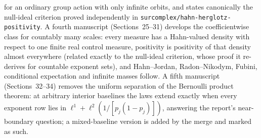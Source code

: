 \documentclass[11pt]{article}
\begin{document}
{for an ordinary group action with only infinite orbits,
and states canonically the null-ideal criterion proved independently in
\nolinkurl{surcomplex/hahn-herglotz-positivity}.  A fourth manuscript (Sections~25--31) develops the coefficientwise
class for countably many scales: every measure has a Hahn-valued density with
respect to one finite real control measure, positivity is positivity of that
density almost everywhere (related exactly to the null-ideal criterion, whose
proof it re-derives for countable exponent sets), and Hahn--Jordan,
Radon--Nikodym, Fubini, conditional expectation and infinite masses follow.  A fifth manuscript (Sections~32--34) removes the uniform separation of the
Bernoulli product theorem: at arbitrary interior baselines the laws extend
exactly when every exponent row lies in $\ell^1+\ell^2(1/[p_j(1-p_j)])$,
answering the report's near-boundary question; a mixed-baseline version is
added by the merge and marked as such.}
\end{document}
